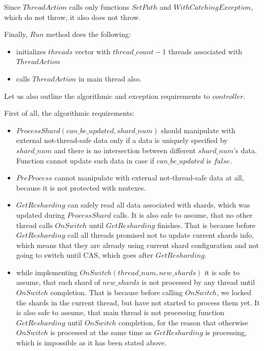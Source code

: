 \documentclass{article}
\begin{document}
Since $ThreadAction$ calls only functions $SetPath$ and $WithCatchingException$, which do not throw, it also does not throw.

Finally, $Run$ method does the following:
\begin{itemize}
	\item initializes $threads$ vector with $thread\_count - 1$ threads associated with $ThreadAction$
	\item calls $ThreadAction$ in main thread also.
\end{itemize}

Let us also outline the algorithmic and exception requirements to $controller$.

First of all, the algorithmic requirements:
\begin{itemize}
	\item $ProcessShard(can\_be\_updated, shard\_num)$ should manipulate with external not-thread-safe data only if a data is uniquely specified by $shard\_num$ and there is no intersection between different $shard\_num$'s data. Function cannot update such data in case if $can\_be\_updated$ is $false$.
	\item $PreProcess$ cannot manipulate with external not-thread-safe data at all, because it is not protected with mutexes.
	\item $GetResharding$ can safely read all data associated with shards, which was updated during $ProcessShard$ calls. It is also safe to assume, that no other thread calls $OnSwitch$ until $GetResharding$ finishes. That is because before $GetResharding$ call all threads promised not to update current shards info, which means that they are already using current shard configuration and not going to switch until CAS, which goes after $GetResharding$.
	\item while implementing $OnSwitch(thread\_num, new\_shards)$ it is safe to assume, that each shard of $new\_shards$ is not processed by any thread until $OnSwitch$ completion. That is because before calling $OnSwitch$, we locked the shards in the current thread, but have not started to process them yet. It is also safe to assume, that main thread is not processing function $GetResharding$ until $OnSwitch$ completion, for the reason that otherwise $OnSwitch$ is processed at the same time as $GetResharding$ is processing, which is impossible as it has been stated above.
\end{itemize}
\end{document}
